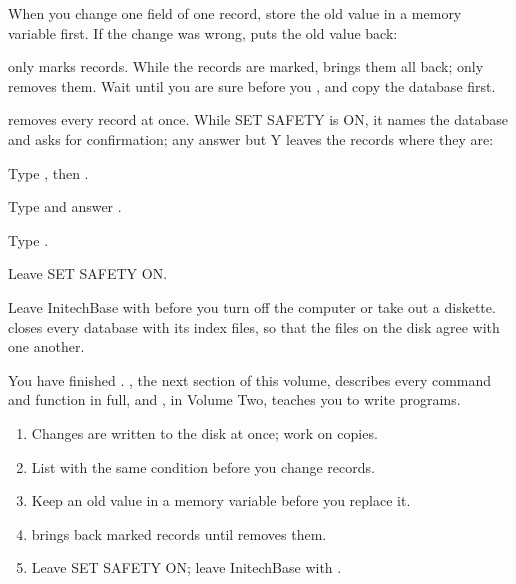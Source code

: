 When you change one field of one record, store the old value in a memory
variable first.  If the change was wrong,  puts the old value
back:

 only marks records.  While the records are marked, 
brings them all back; only  removes them.
Wait until you are sure before you , and copy the database first.

 removes every record at once.  While SET SAFETY is ON, it names the
database and asks for confirmation; any answer but Y leaves the records where
they are:
\begin{Steps}[resume]
\item Type , then .
\item Type  and answer .
\item Type .
\end{Steps}
Leave SET SAFETY ON.

Leave InitechBase with  before you turn off the computer or take out
a diskette.   closes every database with its index files, so that
the files on the disk agree with one another.

You have finished .  , the next section of this volume, describes every command and
function in full, and , in Volume Two,
teaches you to write programs.

\begin{enumerate}
\item Changes are written to the disk at once; work on copies.
\item List with the same  condition before you change records.
\item Keep an old value in a memory variable before you replace it.
\item {} brings back marked records until  removes them.
\item Leave SET SAFETY ON; leave InitechBase with .
\end{enumerate}
